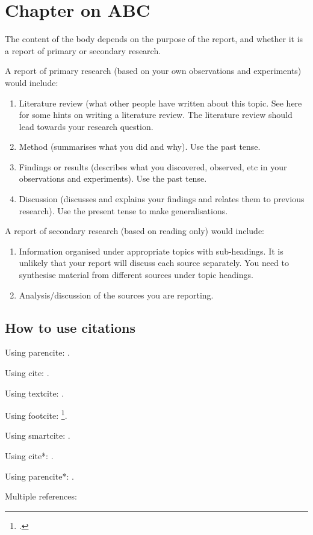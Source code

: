 \chapter{Chapter on ABC}
The content of the body depends on the purpose of the report, and whether it is a report of primary or secondary research.

A report of primary research (based on your own observations and experiments) would include:
\begin{enumerate}
\item
Literature review (what other people have written about this topic. See here for some hints on writing a literature review. The literature review should lead towards your research question.
\item
Method (summarises what you did and why). Use the past tense.
\item
Findings or results (describes what you discovered, observed, etc in your observations and experiments). Use the past tense.
\item
Discussion (discusses and explains your findings and relates them to previous research). Use the present tense to make generalisations.
\end{enumerate}
A report of secondary research (based on reading only) would include:
\begin{enumerate}
\item
Information organised under appropriate topics with sub-headings. It is unlikely that your report will discuss each source separately. You need to synthesise material from different sources under topic headings.
\item
Analysis/discussion of the sources you are reporting.
\end{enumerate}
\section{How to use citations}
Using parencite: \parencite{RN4}.

Using cite: \cite[prenote][postnote]{RN4}.

Using textcite: \textcite{RN4}.

Using footcite: \footcite[prenote][postnote]{RN4}.

Using smartcite: \smartcite{RN4}.
 
Using cite*: \cite*{RN4}.

Using parencite*: \parencite*{RN4}.

Multiple references: \parencites[35]{RN4}[88--120]{RN6}[23]{RN3} %

